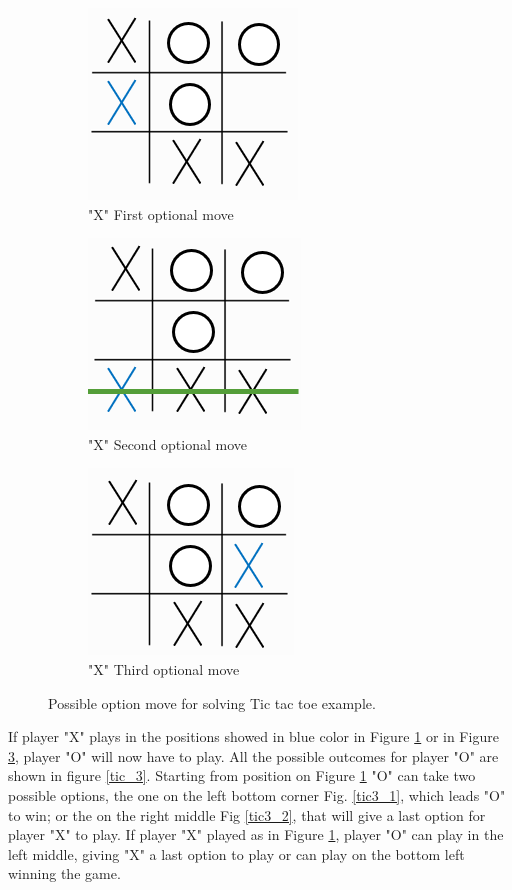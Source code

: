 \documentclass[conference]{IEEEtran}
\begin{document}
\begin{figure}[H]
\centering
\begin{subfigure}{.24\textwidth}
    \centering
    \includegraphics[scale=0.45]{img/chess2_1.png}
    \caption{"X" First optional move}
    \label{tic_2.1}
\end{subfigure}
\begin{subfigure}{.24\textwidth}
    \centering
    \includegraphics[scale=0.45]{img/chess2_2.png} 
    \caption{"X" Second optional move}
    \label{tic_2.2}
\end{subfigure}
\begin{subfigure}{.24\textwidth}
    \centering
    \includegraphics[scale=0.45]{img/chess2_3.png}
    \caption{"X" Third optional move}
    \label{tic_2.3}
\end{subfigure}
\caption{Possible option move for solving Tic tac toe example.}
\label{tic:p2}
\end{figure}

If player "X" plays in the positions showed in blue color in Figure \ref{tic_2.1} or in Figure \ref{tic_2.3}, player "O" will now have to play. All the possible outcomes for player "O" are shown in figure \ref{tic_3}. Starting from position on Figure \ref{tic_2.1} "O" can take two possible options, the one on the left bottom corner Fig. \ref{tic3_1}, which leads "O" to win; or the on the right middle Fig \ref{tic3_2}, that will give a last option for player "X" to play. If player "X" played as in Figure \ref{tic_2.1}, player "O" can play in the left middle, giving "X" a last option to play or can play on the bottom left winning the game. 
\end{document}
